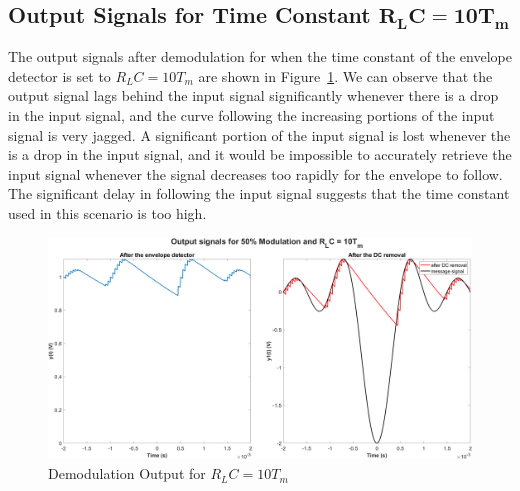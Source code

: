 \documentclass[12pt]{article}
\begin{document}
\subsection*{Output Signals for Time Constant $\bm{R_LC = 10T_m}$}
The output signals after demodulation for when the time constant of the envelope detector is set to $R_LC = 10T_m$ are shown in Figure~\ref{fig:q2ii}. We can observe that the output signal lags behind the input signal significantly whenever there is a drop in the input signal, and the curve following the increasing portions of the input signal is very jagged. A significant portion of the input signal is lost whenever the is a drop in the input signal, and it would be impossible to accurately retrieve the input signal whenever the signal decreases too rapidly for the envelope to follow. The significant delay in following the input signal suggests that the time constant used in this scenario is too high.
\begin{figure}[h!]
    \centering
    \includegraphics[width=\textwidth]{q2ii}
    \caption{\label{fig:q2ii}Demodulation Output for $R_LC = 10T_m$}
\end{figure}
\end{document}
